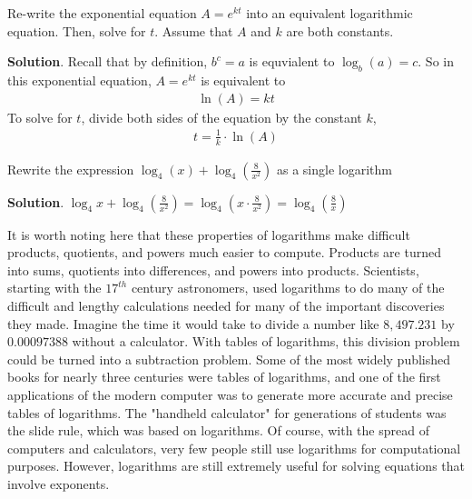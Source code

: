 \documentclass[10pt,]{book}
\theoremstyle{ptxdefinitionnotitle}
\theoremstyle{ptxdefinitiontitle}
\theoremstyle{ptxdefinitionnotitle}
\theoremstyle{ptxdefinitiontitle}
\theoremstyle{ptxdefinitionnotitle}
\theoremstyle{ptxdefinitiontitle}
\numberwithin{equation}{section}
\begin{document}
\begin{example}\label{example-22}
\hypertarget{p-292}{}%
Re-write the exponential equation \(A = e^{kt}\) into an equivalent logarithmic equation. Then, solve for \(t\). Assume that \(A\) and \(k\) are both constants.%
\par\smallskip%
\noindent\textbf{Solution}.\hypertarget{solution-22}{}\quad%
\hypertarget{p-293}{}%
Recall that by definition, \(b ^ c = a\) is equvialent to \(\log_b(a) = c\). So in this exponential equation, \(A = e^{kt}\) is equivalent to%
\begin{gather*}
\ln \left( A \right) = kt
\end{gather*}
To solve for \(t\), divide both sides of the equation by the constant \(k\),%
\begin{gather*}
t = \frac{1}{k} \cdot \ln \left( A \right)
\end{gather*}
%
\end{example}
\begin{example}\label{example-23}
\hypertarget{p-294}{}%
Rewrite the expression \(\log_4(x) + \log_4 \left( \frac{8}{x^2} \right)\) as a single logarithm%
\par\smallskip%
\noindent\textbf{Solution}.\hypertarget{solution-23}{}\quad%
\hypertarget{p-295}{}%
\(\log_4 x + \log_4 \left( \frac{8}{x^2} \right) = \log_4 \left( x \cdot \frac{8}{x^2} \right) = \log_4 \left( \frac{8}{x} \right)\)%
\end{example}
\hypertarget{p-296}{}%
It is worth noting here that these properties of logarithms make difficult products, quotients, and powers much easier to compute.  Products are turned into sums, quotients into differences, and powers into products.  Scientists, starting with the \(17^{th}\) century astronomers, used logarithms to do many of the difficult and lengthy calculations needed for many of the important discoveries they made.  Imagine the time it would take to divide a number like \(8,497.231\) by \(0.00097388\) without a calculator.  With tables of logarithms, this division problem could be turned into a subtraction problem.  Some of the most widely published books for nearly three centuries were tables of logarithms, and one of the first applications of the modern computer was to generate more accurate and precise tables of logarithms.  The "handheld calculator" for generations of students was the slide rule, which was based on logarithms.  Of course, with the spread of computers and calculators, very few people still use logarithms for computational purposes. However, logarithms are still extremely useful for solving equations that involve exponents.%
\typeout{************************************************}
\typeout{************************************************}
\end{document}
